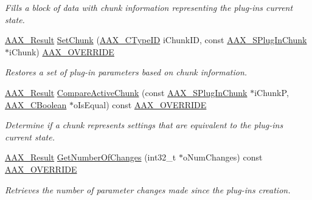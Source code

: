 \begin{Indent}
\begin{DoxyCompactItemize}
\begin{DoxyCompactList}\small\item\em Fills a block of data with chunk information representing the plug-\/in\textquotesingle{}s current state. \end{DoxyCompactList}\item 
\mbox{\hyperlink{a00392_a4d8f69a697df7f70c3a8e9b8ee130d2f}{A\+A\+X\+\_\+\+Result}} \mbox{\hyperlink{a01481_a9908dd1d95995027bf6073c08f38b468}{Set\+Chunk}} (\mbox{\hyperlink{a00392_ac678f9c1fbcc26315d209f71a147a175}{A\+A\+X\+\_\+\+C\+Type\+ID}} i\+Chunk\+ID, const \mbox{\hyperlink{a01421}{A\+A\+X\+\_\+\+S\+Plug\+In\+Chunk}} $\ast$i\+Chunk) \mbox{\hyperlink{a00392_ac2f24a5172689ae684344abdcce55463}{A\+A\+X\+\_\+\+O\+V\+E\+R\+R\+I\+DE}}
\begin{DoxyCompactList}\small\item\em Restores a set of plug-\/in parameters based on chunk information. \end{DoxyCompactList}\item 
\mbox{\hyperlink{a00392_a4d8f69a697df7f70c3a8e9b8ee130d2f}{A\+A\+X\+\_\+\+Result}} \mbox{\hyperlink{a01481_a514644d855be6f58043ec165f6ce8ddb}{Compare\+Active\+Chunk}} (const \mbox{\hyperlink{a01421}{A\+A\+X\+\_\+\+S\+Plug\+In\+Chunk}} $\ast$i\+ChunkP, \mbox{\hyperlink{a00392_aa216506530f1d19a2965931ced2b274b}{A\+A\+X\+\_\+\+C\+Boolean}} $\ast$o\+Is\+Equal) const \mbox{\hyperlink{a00392_ac2f24a5172689ae684344abdcce55463}{A\+A\+X\+\_\+\+O\+V\+E\+R\+R\+I\+DE}}
\begin{DoxyCompactList}\small\item\em Determine if a chunk represents settings that are equivalent to the plug-\/in\textquotesingle{}s current state. \end{DoxyCompactList}\item 
\mbox{\hyperlink{a00392_a4d8f69a697df7f70c3a8e9b8ee130d2f}{A\+A\+X\+\_\+\+Result}} \mbox{\hyperlink{a01481_a9c6e26d6b3e028fcb048e01caa155f65}{Get\+Number\+Of\+Changes}} (int32\+\_\+t $\ast$o\+Num\+Changes) const \mbox{\hyperlink{a00392_ac2f24a5172689ae684344abdcce55463}{A\+A\+X\+\_\+\+O\+V\+E\+R\+R\+I\+DE}}
\begin{DoxyCompactList}\small\item\em Retrieves the number of parameter changes made since the plug-\/in\textquotesingle{}s creation. \end{DoxyCompactList}\end{DoxyCompactItemize}
\end{Indent}
